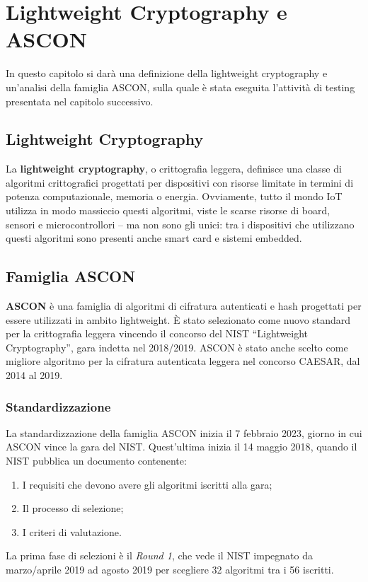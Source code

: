 \chapter{Lightweight Cryptography e ASCON}\label{ch:cryptography}

In questo capitolo si darà una definizione della lightweight cryptography e un'analisi della famiglia ASCON, sulla quale è stata eseguita l'attività di testing presentata nel capitolo successivo.

\section{Lightweight Cryptography}

La \textbf{lightweight cryptography}, o crittografia leggera, definisce una classe di algoritmi crittografici progettati per dispositivi con risorse limitate in termini di potenza computazionale, memoria o energia. Ovviamente, tutto il mondo IoT utilizza in modo massiccio questi algoritmi, viste le scarse risorse di board, sensori e microcontrollori – ma non sono gli unici: tra i dispositivi che utilizzano questi algoritmi sono presenti anche smart card e sistemi embedded.

\section{Famiglia ASCON}

\textbf{ASCON} è una famiglia di algoritmi di cifratura autenticati e hash progettati per essere utilizzati in ambito lightweight. È stato selezionato come nuovo standard per la crittografia leggera vincendo il concorso del NIST ``Lightweight Cryptography'', gara indetta nel 2018/2019. ASCON è stato anche scelto come migliore algoritmo per la cifratura autenticata leggera nel concorso CAESAR, dal 2014 al 2019\cite{ascon-overview}.

\subsection{Standardizzazione}

La standardizzazione della famiglia ASCON inizia il 7 febbraio 2023\cite{nist-timeline}, giorno in cui ASCON vince la gara del NIST. Quest'ultima inizia il 14 maggio 2018\cite{nist-timeline}, quando il NIST pubblica un documento contenente\cite{nist-competition}:
\begin{enumerate}
    \item I requisiti che devono avere gli algoritmi iscritti alla gara;
    \item Il processo di selezione;
    \item I criteri di valutazione.
\end{enumerate}
La prima fase di selezioni è il \textit{Round 1}, che vede il NIST impegnato da marzo/aprile 2019 ad agosto 2019 per scegliere 32 algoritmi tra i 56 iscritti\cite{nist-timeline}\cite{nist-competition}\cite{nist-round-1}. \\

